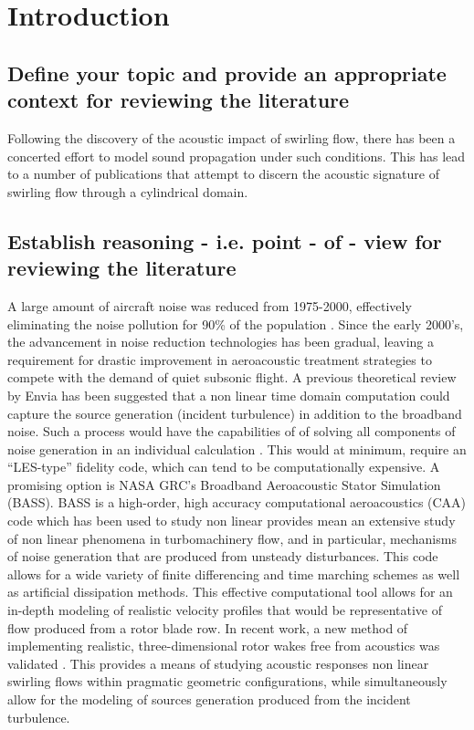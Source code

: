 \section{Introduction}
\subsection{Define your topic and provide an appropriate context for reviewing the literature}

    Following the discovery of the acoustic impact of swirling flow, there has
    been a concerted effort to model sound propagation under such conditions. 
    This has lead to a number of publications that attempt to discern the acoustic
    signature of swirling flow through a cylindrical domain. 

\subsection{Establish reasoning - i.e. point - of - view for reviewing the literature}


A large amount of aircraft noise was reduced from 1975-2000, 
effectively eliminating the noise pollution for 90\% of the population \cite{Administration}. 
Since the early 2000's, the advancement in noise reduction technologies has been gradual, 
leaving a requirement for drastic improvement in aeroacoustic treatment 
strategies to compete with the demand of quiet subsonic  flight. 
A previous theoretical review by Envia has been suggested that a non linear 
time domain computation could capture the source generation (incident turbulence) 
in addition to the broadband noise. Such a process would have the capabilities 
of  of solving all components of noise generation in an individual calculation \cite{Envia2004}. 
This would at minimum, require an ``LES-type'' fidelity code, which can tend 
to be computationally expensive.  A promising option is NASA GRC's Broadband 
Aeroacoustic Stator Simulation (BASS).  BASS is a high-order, high 
accuracy computational aeroacoustics (CAA) code which has been used to study 
non linear provides mean an extensive study of non linear phenomena in 
turbomachinery flow, and in particular, mechanisms of noise generation that are 
produced from unsteady disturbances. This code allows for a wide variety of 
finite differencing and time marching schemes as well as artificial dissipation methods. This effective computational tool allows for an in-depth modeling of realistic velocity profiles that would be representative of flow produced from a rotor blade row. In recent work, a new method of implementing realistic, three-dimensional rotor wakes free from acoustics was validated  \cite{Hixon2011}. This provides a means of studying acoustic responses non linear swirling flows within pragmatic geometric configurations, while simultaneously allow for the modeling of sources generation produced from the incident turbulence. 

